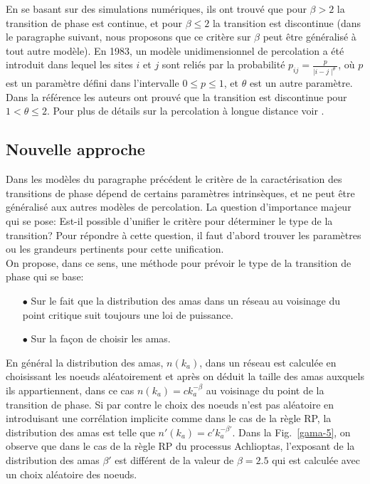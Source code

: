 En se basant sur des simulations numériques, ils ont trouvé que pour $\beta>2$ la transition de phase est continue, et pour $\beta \le 2$ la transition est discontinue (dans le paragraphe suivant, nous proposons que ce critère sur $\beta$ peut être généralisé à tout autre modèle). En 1983, un modèle unidimensionnel de percolation a été introduit \cite{Schulman1983} dans lequel les sites $i$ et $j$ sont reliés par la probabilité $p_{ij}=\frac{p}{\mid i-j\mid^\theta}$, où $p$ est un paramètre défini dans l'intervalle $0\leq p\leq1$, et $\theta$ est un autre  paramètre. Dans la référence \cite{Aizenman-Newman1986} les auteurs ont prouvé que la transition est discontinue pour $1<\theta\leq2$. Pour plus de détails sur la percolation à longue distance voir \cite{Lee-al2016}.\\
\label{etat-art}
\subsection{Nouvelle approche}
Dans les modèles du paragraphe précédent le critère de la caractérisation des transitions de phase dépend de certains paramètres intrinsèques,  et ne peut être généralisé aux autres modèles de percolation. La question d'importance majeur qui se pose: Est-il possible d'unifier le critère pour déterminer le type de la transition? Pour répondre à cette question, il faut d'abord trouver les paramètres ou les grandeurs pertinents pour cette unification.\\
On propose, dans ce sens, une méthode pour prévoir le type de la transition de phase qui se base:
\begin{itemize}
\item[$\bullet$] Sur le fait que la distribution des amas dans un réseau au voisinage du point critique suit toujours une loi de puissance.
\item[$\bullet$] Sur la façon de choisir les amas.
\end{itemize}
En général la distribution des amas, $n(k_a)$, dans un réseau est calculée en choisissant les noeuds aléatoirement et après on déduit la taille des amas auxquels ils appartiennent, dans ce cas $n(k_a)=ck_a^{-\beta}$ au voisinage du point de la transition de phase. Si par contre le choix des noeuds n'est pas aléatoire en introduisant une corrélation implicite comme dans le cas de la règle RP, la distribution des amas est telle que $n'(k_a)=c'k_a^{-\beta'}$.  Dans la Fig.~\ref{gama-5}, on observe que dans le cas de la règle RP du processus Achlioptas, l'exposant de la distribution des amas $\beta'$ est différent de la valeur de $\beta=2.5$ qui est calculée avec un choix aléatoire des noeuds.\\
